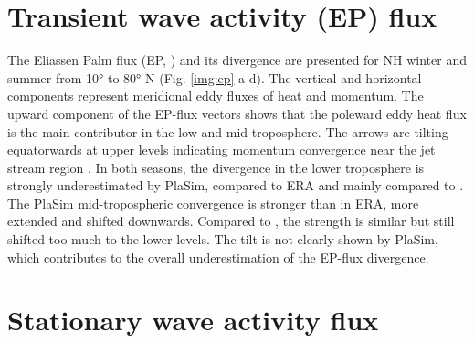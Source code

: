 \documentclass[12pt,a4paper,twoside,openright,headinclude,liststotoc,bibtotoc]{scrreprt}
\begin{document}
\vspace{-0.4cm}
\section{Transient wave activity (EP) flux}
\vspace{-0.4cm}

The Eliassen Palm flux (EP, \citet{Eliassen1961}) and its divergence are presented for NH winter and summer from 10° to 80° N (Fig. \ref{img:ep} a-d). The vertical and horizontal components represent meridional eddy fluxes of heat and momentum. The upward component of the EP-flux vectors shows that the poleward eddy heat flux is the main contributor in the low and mid-troposphere. The arrows are tilting equatorwards at upper levels indicating momentum convergence near the jet stream region \citep{Peixoto1993}. In both seasons, the divergence in the lower troposphere is strongly underestimated by PlaSim, compared to ERA and mainly compared to \citet{Peixoto1993}. The PlaSim mid-tropospheric convergence is stronger than in ERA, more extended and shifted downwards. Compared to \citet{Peixoto1993}, the strength is similar but still shifted too much to the lower levels. The tilt is not clearly shown by PlaSim, which contributes to the overall underestimation of the EP-flux divergence. 


\vspace{-0.4cm}
\section{Stationary wave activity flux}
\vspace{-0.4cm}
\end{document}
